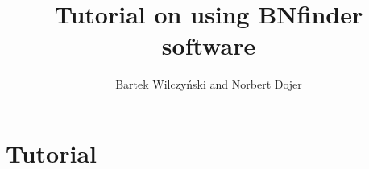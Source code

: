 \documentclass{article}
\title{Tutorial on using BNfinder software}
\author{Bartek Wilczy\'nski and Norbert Dojer}
\begin{document}
\maketitle
\tableofcontents

\section{Tutorial}






\end{document}
